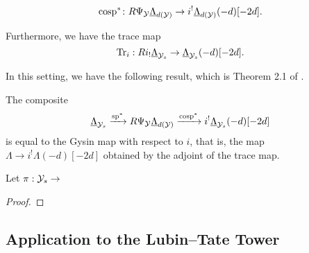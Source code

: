 \documentclass[../main.tex]{subfiles}
\begin{document}
\begin{equation*}
  \mathrm{cosp}^* \colon R\Psi_{\mathcal{Y}} \underline\Lambda_{d(\mathcal{Y})} \to i^!
  \underline\Lambda_{d(\mathcal{Y})}(-d)[-2d].
\end{equation*}

Furthermore, we have the trace map
\begin{equation*}
  \operatorname{Tr}_i: R i_! \underline \Lambda_{\mathcal{Y}_s} \to \underline \Lambda_{\mathcal{Y}_s}(-d)[-2d].
\end{equation*}

In this setting, we have the following result, which is Theorem 2.1 of
\cite{mieda2016geometric}.
\begin{thm}\label{thm:MiedaFirstStepSpecMap}
  The composite 
  $$\underline{\Lambda}_{\mathcal{Y}_s} \xrightarrow{\mathrm{sp}^*} R \Psi_{\mathcal{Y}} \underline \Lambda_{d(\mathcal{Y})} \xrightarrow{\mathrm{cosp}^*} i^! \underline \Lambda_{\mathcal{Y}_s}(-d)[-2d]$$
  is equal to the Gysin map with respect to $i$, that is, the map
  $\Lambda \to i^! \Lambda(-d)[-2d]$ obtained by the adjoint of the trace map.
\end{thm}



\begin{thm}\label{thm:MiedaThmFiniteLvl}
  Let $\pi: \mathcal{Y}_s \to $
\begin{proof}
\end{proof}
\end{thm}


\subsection{Application to the Lubin--Tate Tower} %
\label{sub:Application to the Lubin--Tate Tower}
\end{document}

